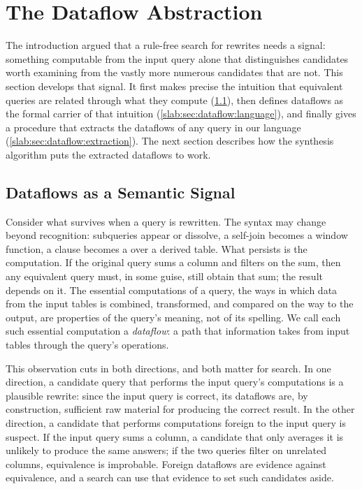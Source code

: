 \section{The Dataflow Abstraction}
\label{slab:sec:dataflow}

The introduction argued that a rule-free search for rewrites needs a
signal: something computable from the input query alone that
distinguishes candidates worth examining from the vastly more numerous
candidates that are not. This section develops that signal. It first
makes precise the intuition that equivalent queries are related through
what they compute (\cref{slab:sec:dataflow:insight}), then defines
dataflows as the formal carrier of that intuition
(\cref{slab:sec:dataflow:language}), and finally gives a procedure that
extracts the dataflows of any query in our language
(\cref{slab:sec:dataflow:extraction}). The next section describes how
the synthesis algorithm puts the extracted dataflows to work.

\subsection{Dataflows as a Semantic Signal}
\label{slab:sec:dataflow:insight}

Consider what survives when a query is rewritten. The syntax may change
beyond recognition: subqueries appear or dissolve, a self-join becomes
a window function, a \sqlhavingcolor clause becomes a \sqlwherecolor
over a derived table. What persists is the computation. If the original
query sums a column and filters on the sum, then any equivalent query
must, in some guise, still obtain that sum; the result depends on it.
The essential computations of a query, the ways in which data from the
input tables is combined, transformed, and compared on the way to the
output, are properties of the query's meaning, not of its spelling. We
call each such essential computation a \emph{dataflow}: a path that
information takes from input tables through the query's operations.

This observation cuts in both directions, and both matter for search.
In one direction, a candidate query that performs the input query's
computations is a plausible rewrite: since the input query is correct,
its dataflows are, by construction, sufficient raw material for
producing the correct result. In the other direction, a candidate that
performs computations foreign to the input query is suspect. If the
input query sums a column, a candidate that only averages it is
unlikely to produce the same answers; if the two queries filter on
unrelated columns, equivalence is improbable. Foreign dataflows are
evidence against equivalence, and a search can use that evidence to
set such candidates aside.

